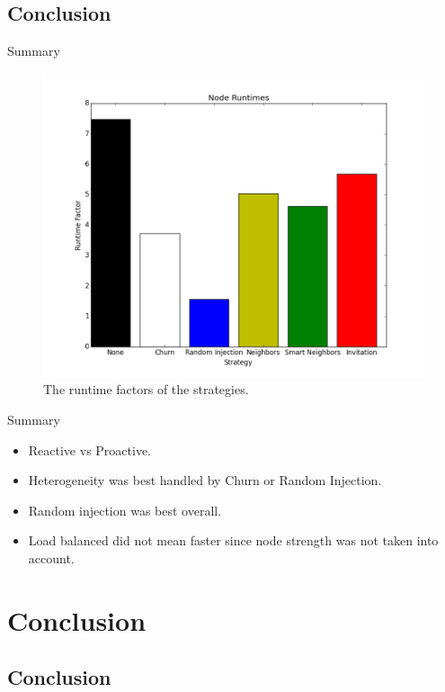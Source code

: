 \documentclass[11pt]{beamer}
\begin{document}
\subsection{Conclusion}


\begin{frame}{Summary}
	
	\begin{figure}
		\centering
		\includegraphics[width=0.7\linewidth]{figs/runtimes}
		\caption[The runtimes of the strategies]{The runtime factors of the strategies.}
		\label{runtimes}
	\end{figure}
	
\end{frame}


\begin{frame}{Summary}
	\begin{itemize}
		
		\item Reactive vs Proactive.
		\item Heterogeneity was best handled by Churn or Random Injection.
		\item Random injection was best overall.
		\item Load balanced did not mean faster since node strength was not taken into account.
	\end{itemize}
\end{frame}


\section{Conclusion}

\subsection{Conclusion}
\end{document}
